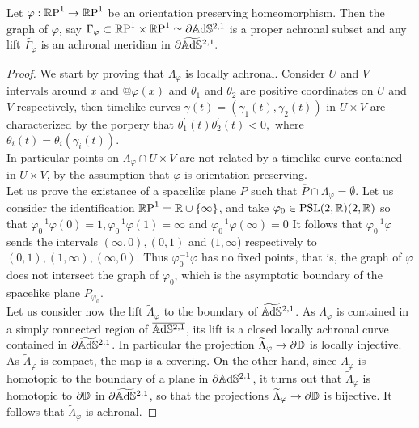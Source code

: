 \begin{lemma}
    Let $\varphi:\mathbb{R}\text{P}^1\to\mathbb{R}\text{P}^1$ be an orientation preserving homeomorphism. Then the graph of $\varphi$, say $\Gamma_\varphi\subset \mathbb{R}\text{P}^1\times\mathbb{R}\text{P}^1\simeq\partial\mathbb{A}\mathrm{d}\mathbb{S}^{2,1}$ is a proper achronal subset and any lift $\tilde{\Gamma_\varphi}$ is an achronal meridian in $\partial\widetilde{\mathbb{A}\mathrm{d}\mathbb{S}}{}^{2,1}.$  
\end{lemma}
\begin{proof}
    We start by proving that $\Lambda_\varphi$ is locally achronal. Consider $U$ and $V$ intervals around $x$ and $@\varphi(x)$ and $\theta_1$ and $\theta_2$ are positive coordinates on $U$ and $V$ respectively, then timelike curves $\gamma(t)=(\gamma_1(t),\gamma_2(t))$ in $U\times V$ are characterized by the porpery that $\theta_1^{\prime} (t)\theta_2^{\prime} (t)<0,$ where $\theta_i(t)=\theta_i(\gamma_i(t)).$ \\
    In particular points on $\Lambda_\varphi\cap U\times V$ are not related by a timelike curve contained in $U\times V$, by the assumption that $\varphi$ is orientation-preserving. \\
    Let us prove the existance of a spacelike plane $P$ such that $\overline{P}\cap \Lambda_\varphi=\emptyset.$ Let us consider the identification $\mathbb{R}\text{P}^1=\mathbb{R}\cup\{\infty\}$, and take $\varphi_0\in\text{PSL}(2,\mathbb{R})(2,\mathbb{R})$ so that $\varphi_0^{-1}\varphi(0)=1, \varphi_0^{-1}\varphi(1)=\infty$ and $\varphi_0^{-1}\varphi(\infty)=0$ It follows that $\varphi_0^{-1}\varphi$ sends the intervals $(\infty,0), (0,1)$ and $(1,\infty$) respectively to $(0,1),(1,\infty),(\infty,0)$. Thus $\varphi_0^{-1}\varphi$ has no fixed points, that is, the graph of $\varphi$ does not intersect the graph of $\varphi_0$, which is the asymptotic boundary of the spacelike plane $P_{\varphi_0}.$\\
    Let us consider now the lift $\widetilde{\Lambda}_\varphi$ to the boundary of $\widetilde{\mathbb{A}\mathrm{d}\mathbb{S}}{}^{2,1}$. As $\Lambda_\varphi$ is contained in a simply connected region of $\overline{\mathbb{A}\mathrm{d}\mathbb{S}^{2,1}}$, its lift is a closed locally achronal curve contained in $\partial\widetilde{\mathbb{A}\mathrm{d}\mathbb{S}}{}^{2,1}$. In particular the projection $\widetilde{\Lambda}_\varphi\to\partial\mathbb{D}$ is locally injective. As $\widetilde{\Lambda}_\varphi$ is compact, the map is a covering. On the other hand, since $\Lambda_\varphi$ is homotopic to the boundary of a plane in $\partial\mathbb{A}\mathrm{d}\mathbb{S}^{2.1}$, it turns out that $\widetilde{\Lambda}_\varphi$ is homotopic to $\partial\mathbb{D}$ in $\partial\widetilde{\mathbb{A}\mathrm{d}\mathbb{S}}{}^{2,1}$, so that the projections $\widetilde{\Lambda}_\varphi\to\partial\mathbb{D}$ is bijective. It follows that $\widetilde{\Lambda}_\varphi$ is achronal.  
\end{proof}

